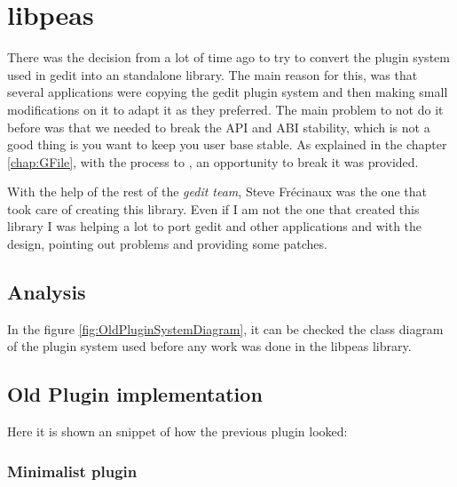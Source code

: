 
\chapter{libpeas}

There was the decision from a lot of time ago to try to convert the plugin system used in gedit into an standalone library. The main reason for this, was that several applications were copying the gedit plugin system and then making small modifications on it to adapt it as they preferred. The main problem to not do it before was that we needed to break the API and ABI stability, which is not a good thing is you want to keep you user base stable. As explained in the chapter \ref{chap:GFile}, with the process to , an opportunity to break it was provided.

With the help of the rest of the \emph{gedit team}, Steve Fr\'ecinaux was the one that took care of creating this library. Even if I am not the one that created this library I was helping a lot to port gedit and other applications and with the design, pointing out problems and providing some patches.

\section{Analysis}


In the figure \ref{fig:OldPluginSystemDiagram}, it can be checked the class diagram of the plugin system used before any work was done in the libpeas library.



\section{Old Plugin implementation}

Here it is shown an snippet of how the previous plugin looked:

\subsection{Minimalist plugin}

